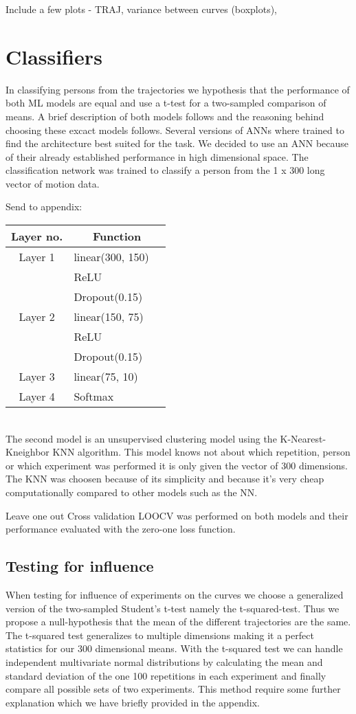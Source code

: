 \documentclass{article}
\begin{document}
Include a few plots - TRAJ, variance between curves (boxplots), 

\section{Classifiers}
In classifying persons from the trajectories we hypothesis that the performance of both ML models are equal and use a t-test for a two-sampled comparison of means. A brief description of both models follows and the reasoning behind choosing these excact models follows.
Several versions of ANNs where trained to find the  architecture best suited for the task. We decided to use an ANN because of their already established performance in high dimensional space. The classification network was trained to classify a person from the 1 x 300 long vector of motion data.   

Send to appendix:
\begin{tabular}[H]{c l @{} l}
\centering
Layer no.       &
\multicolumn{2}{c}{Function} \\
\hline
Layer 1     & linear(300, 150) \\
            & ReLU \\
            & Dropout(0.15) \\
Layer 2     & linear(150, 75) \\ 
            & ReLU \\
            & Dropout(0.15) \\
Layer 3     & linear(75, 10) \\ 
Layer 4     & Softmax\\ 
\end{tabular}\\ 


The second model is an unsupervised clustering model using the K-Nearest-Kneighbor KNN algorithm. This model knows not about which repetition, person or which experiment was performed it is only given the vector of 300 dimensions. 
The KNN was choosen because of its simplicity and because it's very cheap computationally compared to other models such as the NN.

Leave one out Cross validation LOOCV was performed on both models and their performance evaluated with the zero-one loss function.


\subsection{Testing for influence}
When testing for influence of experiments on the curves we choose a  generalized version of the two-sampled Student's t-test namely the t-squared-test. Thus we propose a null-hypothesis that the mean of the different trajectories are the same. The t-squared test generalizes to multiple dimensions making it a perfect statistics for our 300 dimensional means. With the t-squared test we can handle independent multivariate normal distributions by calculating the mean and standard deviation of the one 100 repetitions in each experiment and finally compare all possible sets of two experiments. This method require some further explanation which we have briefly provided in the appendix.
\end{document}
